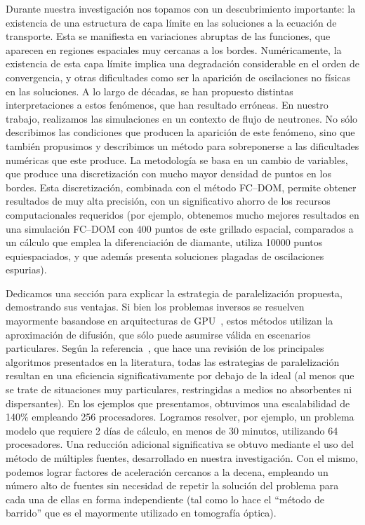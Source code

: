 Durante nuestra investigación nos topamos con un descubrimiento importante: 
la existencia de una estructura de capa límite en las soluciones a la 
ecuación de transporte. Esta se manifiesta en variaciones abruptas 
de las funciones, que aparecen en regiones espaciales 
muy cercanas a los bordes. 
Numéricamente, la existencia de esta capa límite implica una 
degradación considerable en el orden de convergencia, y otras dificultades 
como ser la aparición de oscilaciones no físicas en las soluciones. 
A lo largo de décadas, se han propuesto distintas interpretaciones a 
estos fenómenos, que han resultado erróneas.
En nuestro trabajo, realizamos las simulaciones en un contexto de flujo 
de neutrones. 
No sólo describimos las condiciones que producen la aparición de 
este fenómeno, sino que también propusimos y describimos un método 
para sobreponerse a las dificultades numéricas que este produce. 
La metodología se basa en un cambio de 
variables, que produce una discretización con mucho mayor densidad de 
puntos en los bordes. Esta discretización, combinada con el método FC--DOM, 
permite obtener resultados de muy alta precisión, con un significativo 
ahorro de los recursos computacionales requeridos (por ejemplo, 
obtenemos mucho mejores resultados en una simulación FC--DOM con 400 puntos de 
este grillado espacial, comparados a un cálculo que emplea la diferenciación de 
diamante, utiliza 10000 puntos equiespaciados, y que además presenta 
soluciones plagadas de oscilaciones espurias).

Dedicamos una sección para explicar la 
estrategia de paralelización propuesta, demostrando sus ventajas.
Si bien los problemas inversos se resuelven mayormente basandose 
en arquitecturas de GPU~\cite{Doulgerakis2017}, estos métodos 
utilizan la aproximación de difusión, que sólo puede asumirse 
válida en escenarios particulares. 
Según la referencia~\cite{Coelho2014}, que hace una revisión de los 
principales algoritmos presentados en la literatura, 
todas las estrategias de paralelización resultan en una 
eficiencia significativamente por debajo de la ideal (al menos que se 
trate de situaciones muy particulares, restringidas a medios no 
absorbentes ni dispersantes).
En los ejemplos que presentamos, obtuvimos una escalabilidad de 
140\% empleando 256 procesadores. Logramos resolver, por ejemplo, 
un problema modelo que requiere 2 días de cálculo, en menos de 30 minutos, 
utilizando 64 procesadores.
Una reducción adicional significativa se obtuvo mediante el uso 
del método de múltiples fuentes, desarrollado en nuestra investigación.
Con el mismo, podemos lograr factores de aceleración cercanos a la 
decena, empleando un número alto de fuentes sin necesidad de 
repetir la solución del problema para cada una de ellas en forma 
independiente (tal como lo hace el ``método de barrido'' 
que es el mayormente utilizado en tomografía óptica).

